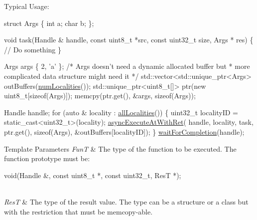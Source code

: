 Typical Usage\-: 
\begin{DoxyCode}
\textcolor{keyword}{struct }Args \{
  \textcolor{keywordtype}{int} a;
  \textcolor{keywordtype}{char} b;
\};

\textcolor{keywordtype}{void} task(Handle & handle, \textcolor{keyword}{const} uint8\_t *src, \textcolor{keyword}{const} uint32\_t size,
          Args * res) \{
  \textcolor{comment}{// Do something}
\}

Args args \{ 2, \textcolor{charliteral}{'a'} \};
\textcolor{comment}{/* Args doesn't need a dynamic allocated buffer but}
\textcolor{comment}{ * more complicated data structure might need it */}
std::vector<std::unique\_ptr<Args> outBuffers(\hyperlink{namespaceshad_1_1rt_a199bb50c21e9012f615520413872aef6}{numLocalities}());
std::unique\_ptr<uint8\_t[]> ptr(\textcolor{keyword}{new} uint8\_t[\textcolor{keyword}{sizeof}(Args)]);
memcpy(ptr.get(), &args, \textcolor{keyword}{sizeof}(Args));

Handle handle;
\textcolor{keywordflow}{for} (\textcolor{keyword}{auto} & locality : \hyperlink{namespaceshad_1_1rt_adea42bceb84b2161df8fece9d20cb7cf}{allLocalities}()) \{
  uint32\_t localityID = \textcolor{keyword}{static\_cast<}uint32\_t\textcolor{keyword}{>}(locality);
  \hyperlink{namespaceshad_1_1rt_a5ef970b04fc171862dc8b0c4cb6308d4}{asyncExecuteAtWithRet}(
    handle, locality, task, ptr.get(), \textcolor{keyword}{sizeof}(Args),
    &outBuffers[localityID]);
\}
\hyperlink{namespaceshad_1_1rt_a6ea1d3672bac3a80032863b6732a0c0a}{waitForCompletion}(handle);
\end{DoxyCode}



\begin{DoxyTemplParams}{Template Parameters}
{\em Fun\-T} & The type of the function to be executed. The function prototype must be\-: 
\begin{DoxyCode}
void(Handle &, \textcolor{keyword}{const} uint8\_t *, \textcolor{keyword}{const} uint32\_t, ResT *);
\end{DoxyCode}
\\
\hline
{\em Res\-T} & The type of the result value. The type can be a structure or a class but with the restriction that must be memcopy-\/able.\\
\hline
\end{DoxyTemplParams}

